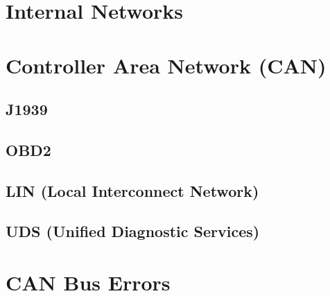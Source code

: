 \section{Internal Networks}

\section{Controller Area Network (CAN)}

\subsection{J1939}

\subsection{OBD2}

\subsection{LIN (Local Interconnect Network)}

\subsection{UDS (Unified Diagnostic Services)}

\section{CAN Bus Errors}

